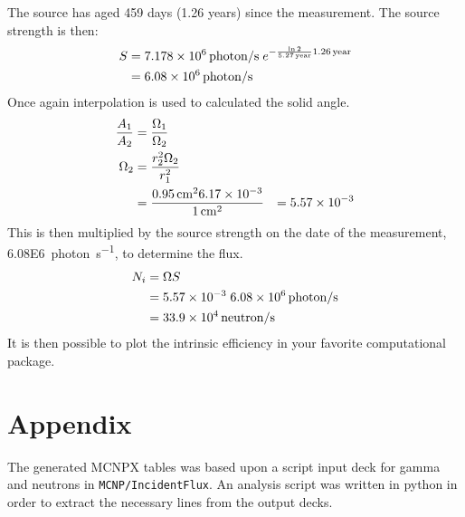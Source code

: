 \documentclass[draftcls,onecolumn]{IEEEtran}
\begin{document}
\begin{Exercise*}[label={LiBorateGlass},title={Li borate glass},name={Example}]
The  source has aged 459 days (1.26 years) since the measurement.
The source strength is then:
\begin{align}
  S &= \SI{7.178E6}{photon\per\second}\;e^{-\frac{ \ln{2}}{\SI{5.27}{year}}\SI{1.26}{year}} \\ \notag
    &= \SI{6.08E6}{photon\per\second}
\end{align}
Once again interpolation is used to calculated the solid angle.
\begin{align*}
	\frac{A_1}{A_2} &= \frac{\Omega_1}{\Omega_2} \\ \notag
	\Omega_2 &= \frac{r_2^2 \Omega_2}{r_1^2} \\
	 &= \frac{\SI{0.95}{\cm}^2 \num{6.17E-3}}{\SI{1}{\cm}^2}
	 &= \num{5.57E-3}
\end{align*}
This is then multiplied by the source strength on the date of the measurement, \SI{6.08E6}{photon\per\second}, to determine the flux.
\begin{align*}
 	N_i &= \Omega S \\
	 &= \num{5.57E-3} \; \SI{6.08E6}{photon\per\second} \\
      &= \SI{33.9E4}{neutron\per\second}
\end{align*}
It is then possible to plot the intrinsic efficiency in your favorite computational package.

\end{Exercise*}



\section{Appendix}
The generated MCNPX tables was based upon a script input deck for gamma and neutrons in \verb+MCNP/IncidentFlux+.
An analysis script was written in python in order to extract the necessary lines from the output decks.
\end{document}
